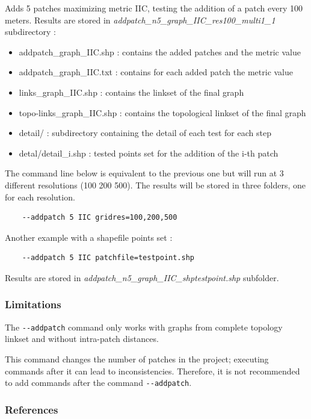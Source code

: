 \documentclass[a4paper,10pt]{report}
\begin{document}
Adds 5 patches maximizing metric IIC, testing the addition of a patch every 100 meters.
Results are stored in \textit{addpatch\_n5\_graph\_IIC\_res100\_multi1\_1} subdirectory :
\begin{itemize}
 \item addpatch\_graph\_IIC.shp : contains the added patches and the metric value 
 \item addpatch\_graph\_IIC.txt : contains for each added patch the metric value 
 \item links\_graph\_IIC.shp : contains the linkset of the final graph
 \item topo-links\_graph\_IIC.shp : contains the topological linkset of the final graph
 \item detail/ : subdirectory containing the detail of each test for each step
 \item detal/detail\_i.shp : tested points set for the addition of the i-th patch 
\end{itemize}


The command line below is equivalent to the previous one but will run at 3 different resolutions (100 200 500). The results will be stored in three folders, one for each resolution.
\begin{Verbatim}
	--addpatch 5 IIC gridres=100,200,500
\end{Verbatim}

Another example with a shapefile points set :
\begin{Verbatim}
	--addpatch 5 IIC patchfile=testpoint.shp
\end{Verbatim}
Results are stored in \textit{addpatch\_n5\_graph\_IIC\_shptestpoint.shp} subfolder.

\subsubsection{Limitations}
The \verb|--addpatch| command only works with graphs from complete topology linkset and without intra-patch distances.

This command changes the number of patches in the project; executing commands after it can lead to inconsistencies.
Therefore, it is not recommended to add commands after the command \verb|--addpatch|.

\subsubsection{References}
\cite{2015_addpatch_rainette, 2014_LUP}
\end{document}
